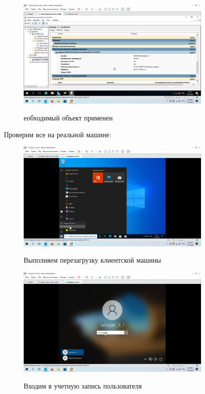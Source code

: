 \documentclass[a4paper]{article}
\begin{document}
  \begin{figure}[H]
    \centering
    \includegraphics[width=0.85\textwidth]{5_0146}
    \label{img:146}
    \caption{еобходимый объект применен}
  \end{figure}

  Проверим все на реальной машине:

  \begin{figure}[H]
    \centering
    \includegraphics[width=0.85\textwidth]{5_0150}
    \label{img:150}
    \caption{Выполняем перезагрузку клиентской машины}
  \end{figure}

  \begin{figure}[H]
    \centering
    \includegraphics[width=0.85\textwidth]{5_0151}
    \label{img:151}
    \caption{Входим в учетную запись пользователя}
  \end{figure}
\end{document}
